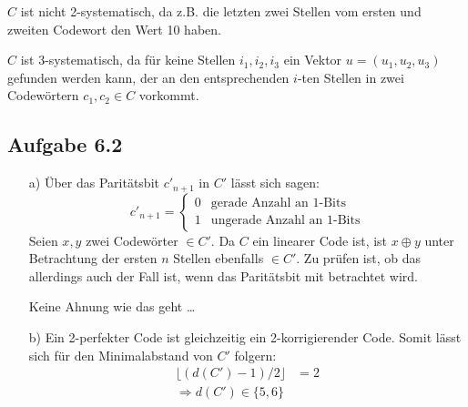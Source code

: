 \documentclass{article}
\begin{document}
\begin{enumerate}
        $C$ ist nicht 2-systematisch, da z.B. die letzten zwei Stellen vom ersten und zweiten Codewort den Wert 10 haben.

        $C$ ist 3-systematisch, da für keine Stellen $i_1, i_2, i_3$ ein Vektor $u = (u_1, u_2, u_3)$ gefunden werden kann, der an den entsprechenden $i$-ten Stellen in zwei Codewörtern $c_1, c_2 \in C$ vorkommt.  
    \end{enumerate}

    

    \subsection*{Aufgabe 6.2}
    \begin{enumerate}
        \item[a)] Über das Paritätsbit $c'_{n+1}$ in $C'$ lässt sich sagen: 
        \begin{equation*}
            c'_{n+1} = 
            \begin{cases}
                0 & \text{gerade Anzahl an 1-Bits} \\
                1 & \text{ungerade Anzahl an 1-Bits}
            \end{cases}
        \end{equation*}
        Seien $x, y$ zwei Codewörter $\in C'$. Da $C$ ein linearer Code ist, ist $x \oplus y$ unter Betrachtung der ersten $n$ Stellen ebenfalls $\in C'$. Zu prüfen ist, ob das allerdings auch der Fall ist, wenn das Paritätsbit mit betrachtet wird.

        Keine Ahnung wie das geht \dots
        \item[b)] Ein 2-perfekter Code ist gleichzeitig ein 2-korrigierender Code. Somit lässt sich für den Minimalabstand von $C'$ folgern:
        \begin{align*}
            \lfloor(d(C')-1)/2\rfloor &= 2 \\
            \Rightarrow d(C') \in \{5,6\}
        \end{align*} 
    \end{enumerate}
\end{document}
